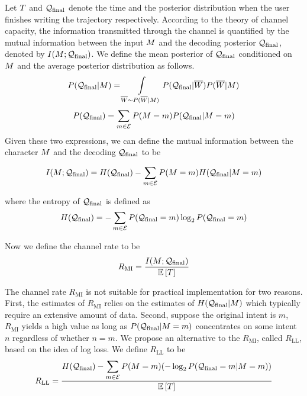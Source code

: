 \documentclass{sigchi}
\begin{document}
Let $T$ and $\mathcal{Q}_{\mathrm{final}}$ denote the time and the posterior
distribution when the user finishes writing the trajectory
respectively.  According to the theory of channel capacity, the
information transmitted through the channel is quantified by the
mutual information between the input $M$ and the decoding
posterior $\mathcal{Q}_{\mathrm{final}}$, denoted by $I(M ; \mathcal{Q}_{\mathrm{final}})$. We
define the mean posterior of $\mathcal{Q}_{\mathrm{final}}$ conditioned on $M$ and
the average posterior distribution as follows.
\[
P(\mathcal{Q}_{\mathrm{final}} | M) =
\int\limits_{\overline{W} \sim P(\overline{W} | M)} { P(\mathcal{Q}_{\mathrm{final}} | \overline{W})
P(\overline{W} | M)} 
\]
\[
P(\mathcal{Q}_{\mathrm{final}})
=
\sum_{m \in \mathcal{E}} 
P(M = m) P(\mathcal{Q}_{\mathrm{final}} | M = m)
\]
Given these two expressions, we can define the mutual information
between the character $M$ and the decoding $\mathcal{Q}_{\mathrm{final}}$ to be 
{
\small
\[
I(M ; \mathcal{Q}_{\mathrm{final}}) = 
H(\mathcal{Q}_{\mathrm{final}})
- \sum_{m \in \mathcal{E}} P(M = m) H(\mathcal{Q}_{\mathrm{final}} | M = m)
\]

}
where the entropy of $\mathcal{Q}_{\mathrm{final}}$ is defined as
\[
H(\mathcal{Q}_{\mathrm{final}}) = -\sum_{m \in \mathcal{E}} {
P(\mathcal{Q}_{\mathrm{final}} = m) \log_2 P(\mathcal{Q}_{\mathrm{final}} = m)}
\]

\newcommand{\RMI}{R_{\mathrm{MI}}}
\newcommand{\RLL}{R_{\mathrm{LL}}}

Now we define the channel rate to be 
\begin{align}
\label{eq:channel_rate}
\RMI
= 
\frac{I( \intent ;  \predFinal)}{\expectedDuration}
\end{align}

The channel rate $\RMI$ is not suitable for practical implementation
for two reasons. First, the estimates of $\RMI$ relies on the
estimates of $H(\mathcal{Q}_{\mathrm{final}} | M)$ which typically require an
extensive amount of data. Second, suppose the original intent is
$m$, $\RMI$ yields a high value as long as $P(\mathcal{Q}_{\mathrm{final}} | M =
m)$ concentrates on some intent $n$ regardless of whether $n = m$.  We
propose an alternative to the $\RMI$, called $\RLL$, based on the idea
of log loss. We define $\RLL$ to be
{ 
\scriptsize
\begin{align}
\label{eq:channel_rate_ll}
\RLL = \frac{H(\predFinal) 
 - \displaystyle\sum_{m \in \intentSet} P(\intent = m) (-\log_2 P(\predFinal = m | \intent = m))}{\expectedDuration}
\end{align}
}
\end{document}
